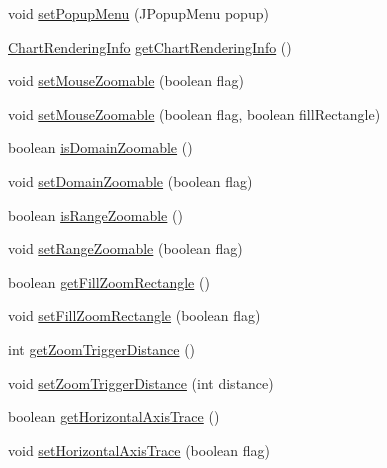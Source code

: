 \begin{DoxyCompactItemize}
\item 
void \mbox{\hyperlink{classorg_1_1jfree_1_1chart_1_1_chart_panel_a7350e5cd7d0840d968947ba76efd12dd}{set\+Popup\+Menu}} (J\+Popup\+Menu popup)
\item 
\mbox{\hyperlink{classorg_1_1jfree_1_1chart_1_1_chart_rendering_info}{Chart\+Rendering\+Info}} \mbox{\hyperlink{classorg_1_1jfree_1_1chart_1_1_chart_panel_a7b2abb8f9375ac6b68f7e1a83903cf74}{get\+Chart\+Rendering\+Info}} ()
\item 
void \mbox{\hyperlink{classorg_1_1jfree_1_1chart_1_1_chart_panel_ab72694f71a53fe8fdd3ed79cd1a990f7}{set\+Mouse\+Zoomable}} (boolean flag)
\item 
void \mbox{\hyperlink{classorg_1_1jfree_1_1chart_1_1_chart_panel_a98d10a662c3c4844c0924581ea40d4fe}{set\+Mouse\+Zoomable}} (boolean flag, boolean fill\+Rectangle)
\item 
boolean \mbox{\hyperlink{classorg_1_1jfree_1_1chart_1_1_chart_panel_abe207b99e856fd828dfd87c6122e5c34}{is\+Domain\+Zoomable}} ()
\item 
void \mbox{\hyperlink{classorg_1_1jfree_1_1chart_1_1_chart_panel_ae8ea6f7c3fa262fac32a8a584c9008f4}{set\+Domain\+Zoomable}} (boolean flag)
\item 
boolean \mbox{\hyperlink{classorg_1_1jfree_1_1chart_1_1_chart_panel_a0742636acafe8eee200bc16f1083859d}{is\+Range\+Zoomable}} ()
\item 
void \mbox{\hyperlink{classorg_1_1jfree_1_1chart_1_1_chart_panel_aa8994e9572dccd489e94bd9d2f001da8}{set\+Range\+Zoomable}} (boolean flag)
\item 
boolean \mbox{\hyperlink{classorg_1_1jfree_1_1chart_1_1_chart_panel_a718c81edc5ae54b6fb8221d6ac05947d}{get\+Fill\+Zoom\+Rectangle}} ()
\item 
void \mbox{\hyperlink{classorg_1_1jfree_1_1chart_1_1_chart_panel_a3ada07f651391e5e81f9505e202f64cc}{set\+Fill\+Zoom\+Rectangle}} (boolean flag)
\item 
int \mbox{\hyperlink{classorg_1_1jfree_1_1chart_1_1_chart_panel_a9fe3d4e3aa18fcbdc16d91cd980516b8}{get\+Zoom\+Trigger\+Distance}} ()
\item 
void \mbox{\hyperlink{classorg_1_1jfree_1_1chart_1_1_chart_panel_aad79bcbc2f2461e923a959dee8bfadcc}{set\+Zoom\+Trigger\+Distance}} (int distance)
\item 
boolean \mbox{\hyperlink{classorg_1_1jfree_1_1chart_1_1_chart_panel_a0f4af0deefba27769f017792196c130b}{get\+Horizontal\+Axis\+Trace}} ()
\item 
void \mbox{\hyperlink{classorg_1_1jfree_1_1chart_1_1_chart_panel_aa8ed816d3ca76279c899d68408020bfb}{set\+Horizontal\+Axis\+Trace}} (boolean flag)

\end{DoxyCompactItemize}
